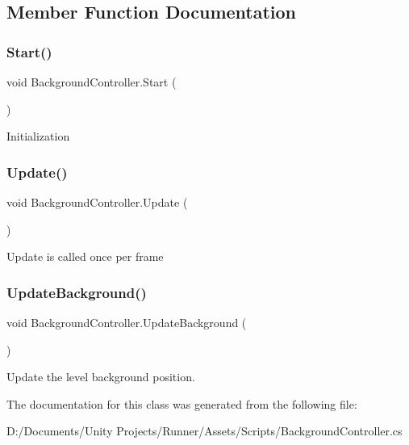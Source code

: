 \subsection{Member Function Documentation}
\mbox{\label{class_background_controller_ae65426d342e98cb14dab526c8bd5eadf}} 
\subsubsection{\texorpdfstring{Start()}{Start()}}
{\footnotesize\ttfamily void Background\+Controller.\+Start (\begin{DoxyParamCaption}{ }\end{DoxyParamCaption})\hspace{0.3cm}{\ttfamily [private]}}

Initialization \mbox{\label{class_background_controller_a8b0308f1657005894bfcc4abb4cf0dcc}} 
\subsubsection{\texorpdfstring{Update()}{Update()}}
{\footnotesize\ttfamily void Background\+Controller.\+Update (\begin{DoxyParamCaption}{ }\end{DoxyParamCaption})\hspace{0.3cm}{\ttfamily [private]}}

Update is called once per frame \mbox{\label{class_background_controller_aed6fe8cd55d54cee3db479e5106738af}} 
\subsubsection{\texorpdfstring{Update\+Background()}{UpdateBackground()}}
{\footnotesize\ttfamily void Background\+Controller.\+Update\+Background (\begin{DoxyParamCaption}{ }\end{DoxyParamCaption})\hspace{0.3cm}{\ttfamily [private]}}

Update the level background position. 

The documentation for this class was generated from the following file\+:\begin{DoxyCompactItemize}
\item 
D\+:/\+Documents/\+Unity Projects/\+Runner/\+Assets/\+Scripts/Background\+Controller.\+cs\end{DoxyCompactItemize}
